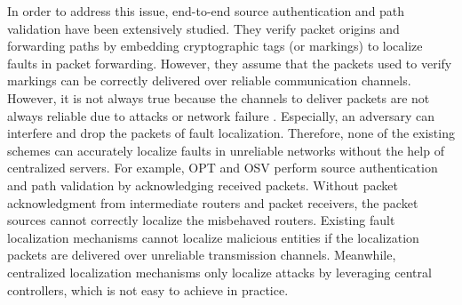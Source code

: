 
In order to address this issue, end-to-end source authentication \cite{liu2008passport} \cite{perrig2001efficient} and path validation \cite{parno2008snapp} \cite{zhao2005aggregated} \cite{kent2000secure} have been extensively studied. %
They verify packet origins and forwarding paths by embedding cryptographic tags (or markings) to localize faults in packet forwarding. 
However, they assume that the packets used to verify markings can be correctly delivered over reliable communication channels. However, it is not always true because the channels to deliver packets are not always reliable due to attacks or network failure \cite{miles1992causes} \cite{basescu2016high} \cite{schrank2011anatomy}. Especially, an adversary can interfere and drop the packets of fault localization. Therefore, none of the existing schemes can accurately localize faults in unreliable networks without the help of centralized servers. For example, OPT \cite{kim2014lightweight} and OSV \cite{cai2015source} perform source authentication and path validation by acknowledging received packets. %
Without packet acknowledgment from intermediate routers and packet receivers, the packet sources cannot correctly localize the misbehaved routers. Existing fault localization mechanisms \cite{basescu2016high} \cite{zhang2012shortmac} cannot localize malicious entities if the localization packets are delivered over unreliable transmission channels. Meanwhile, centralized localization mechanisms \cite{zhang2016mind} \cite{zhang2012secure} only localize attacks by leveraging central controllers, which is not easy to achieve in practice. %

